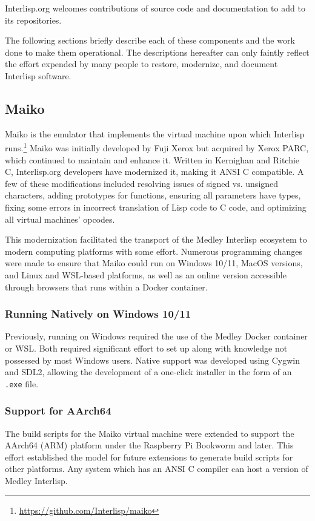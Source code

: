 \documentclass[sigconf]{acmart}
\begin{document}
Interlisp.org welcomes contributions of source code and documentation to add to its repositories.

The following sections briefly describe each of these components and the work done to make them operational. The descriptions hereafter can only faintly reflect the effort expended by many people to restore, modernize, and document Interlisp software.

\subsection{Maiko}

Maiko is the emulator that implements the virtual machine upon which Interlisp runs.\footnote{\url{https://github.com/Interlisp/maiko}} Maiko was initially developed by Fuji Xerox but acquired by Xerox PARC, which continued to maintain and enhance it. Written in Kernighan and Ritchie C, Interlisp.org developers have modernized it, making it ANSI C compatible. A few of these modifications included resolving issues of signed vs. unsigned characters, adding prototypes for functions, ensuring all parameters have types, fixing some errors in incorrect translation of Lisp code to C code, and optimizing all virtual machines' opcodes. 

This modernization facilitated the transport of the Medley Interlisp ecosystem to modern computing platforms with some effort. Numerous programming changes were made to ensure that Maiko could run on Windows 10/11, MacOS versions, and Linux and WSL-based platforms, as well as an online version accessible through browsers that runs within a Docker container.
 
\subsubsection{Running Natively on Windows 10/11}

Previously, running on Windows required the use of the Medley Docker container or WSL. Both required significant effort to set up along with knowledge not possessed by most Windows users. Native support was developed using Cygwin and SDL2, allowing the development of a one-click installer in the form of an \texttt{.exe} file.

\subsubsection{Support for AArch64}

The build scripts for the Maiko virtual machine were extended to support the AArch64 (ARM) platform under the Raspberry Pi Bookworm and later. This effort established the model for future extensions to generate build scripts for other platforms. Any system which has an ANSI C compiler can host a version of Medley Interlisp.
\end{document}
